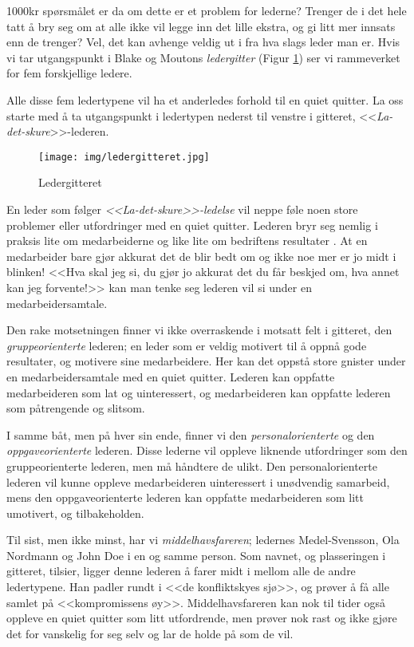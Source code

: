 \documentclass[a4paper, 12pt]{article}  %
\begin{document}
1000kr spørsmålet er da om dette er et problem for lederne? 
Trenger de i det hele tatt å bry seg om at alle ikke vil legge inn det lille ekstra, og gi litt mer innsats enn de trenger? 
Vel, det kan avhenge veldig ut i fra hva slags leder man er. 
Hvis vi tar utgangspunkt i Blake og Moutons \emph{ledergitter} (Figur \ref{fig:ledergitter}) ser vi rammeverket for fem forskjellige ledere.

Alle disse fem ledertypene vil ha et anderledes forhold til en quiet quitter. 
La oss starte med å ta utgangspunkt i ledertypen nederst til venstre i gitteret, <<\emph{La-det-skure}>>-lederen.

\begin{figure}[H]
  \centering
  \texttt{[image: img/ledergitteret.jpg]}
  \caption{Ledergitteret \parencite[63]{ledelse}}
  \label{fig:ledergitter}
\end{figure}

En leder som følger \emph{<<La-det-skure>>-ledelse} vil neppe føle noen store problemer eller utfordringer med en quiet quitter. 
Lederen bryr seg nemlig i praksis lite om medarbeiderne og like lite om bedriftens resultater \parencite{ledelse}. 
At en medarbeider bare gjør akkurat det de blir bedt om og ikke noe mer er jo midt i blinken! 
<<Hva skal jeg si, du gjør jo akkurat det du får beskjed om, hva annet kan jeg forvente!>> kan man tenke seg lederen vil si under en medarbeidersamtale.

Den rake motsetningen finner vi ikke overraskende i motsatt felt i gitteret, den \emph{gruppeorienterte} lederen; 
en leder som er veldig motivert til å oppnå gode resultater, og motivere sine medarbeidere. 
Her kan det oppstå store gnister under en medarbeidersamtale med en quiet quitter. 
Lederen kan oppfatte medarbeideren som lat og uinteressert, og medarbeideren kan oppfatte lederen som påtrengende og slitsom.

I samme båt, men på hver sin ende, finner vi den \emph{personalorienterte} og den \emph{oppgaveorienterte} lederen. 
Disse lederne vil oppleve liknende utfordringer som den gruppeorienterte lederen, men må håndtere de ulikt. 
Den personalorienterte lederen vil kunne oppleve medarbeideren uinteressert i unødvendig samarbeid, mens den oppgaveorienterte lederen kan oppfatte medarbeideren som litt umotivert, og tilbakeholden. 

Til sist, men ikke minst, har vi \emph{middelhavsfareren}; ledernes Medel-Svensson, Ola Nordmann og John Doe i en og samme person. 
Som navnet, og plasseringen i gitteret, tilsier, ligger denne lederen å farer midt i mellom alle de andre ledertypene. 
Han padler rundt i <<de konfliktskyes sjø>>, og prøver å få alle samlet på <<kompromissens øy>>. 
Middelhavsfareren kan nok til tider også oppleve en quiet quitter som litt utfordrende, men prøver nok rast og ikke gjøre det for vanskelig for seg selv og lar de holde på som de vil.
\end{document}
